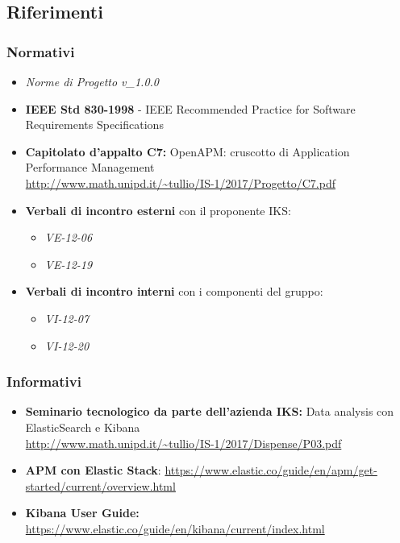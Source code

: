 	\subsection{Riferimenti}
	\subsubsection{Normativi}
	\begin{itemize}
		\item \emph{Norme di Progetto v\_1.0.0}
		\item \textbf{IEEE Std 830-1998} - IEEE Recommended Practice for Software Requirements Specifications
		\item \textbf{Capitolato d'appalto C7:} OpenAPM: cruscotto di Application Performance Management \\ \url{http://www.math.unipd.it/~tullio/IS-1/2017/Progetto/C7.pdf}
		\item \textbf{Verbali di incontro esterni } con il proponente IKS: \begin{itemize}
			\item \emph{VE-12-06}
			\item \emph{VE-12-19}
		\end{itemize}
		\item \textbf{Verbali di incontro interni }con i componenti del gruppo:
		\begin{itemize}
			\item \emph{VI-12-07}
			\item \emph{VI-12-20}
		\end{itemize}
	\end{itemize}
	
	\subsubsection{Informativi}
	\begin{itemize}
		\item \textbf{Seminario tecnologico da parte dell'azienda IKS:} Data analysis con ElasticSearch e Kibana \\ \url{http://www.math.unipd.it/~tullio/IS-1/2017/Dispense/P03.pdf}
		\item \textbf{APM con Elastic Stack}: \url{https://www.elastic.co/guide/en/apm/get-started/current/overview.html}
		\item \textbf{Kibana User Guide:} \url{https://www.elastic.co/guide/en/kibana/current/index.html}
	
	\end{itemize}
	